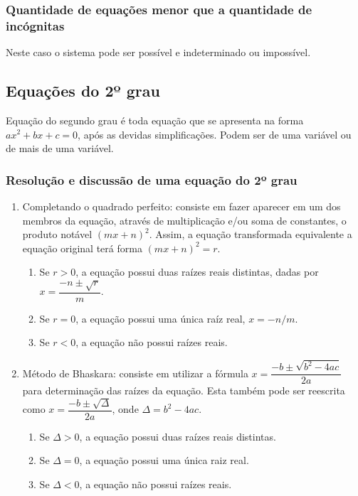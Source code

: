 \documentclass{article}
\begin{document}
\subsubsection{Quantidade de equações menor que a quantidade de incógnitas}
Neste caso o sistema pode ser possível e indeterminado ou impossível.


\subsection{Equações do 2º grau}
Equação do segundo grau é toda equação que se apresenta na forma $ax^2+bx+c=0$, após as devidas simplificações. Podem ser de uma variável ou de mais de uma variável.

\subsubsection{Resolução e discussão de uma equação do 2º grau}
\begin{enumerate}
    \item Completando o quadrado perfeito: consiste em fazer aparecer em um dos membros da equação, através de multiplicação e/ou soma de constantes, o produto notável $(mx+n)^2$. Assim, a equação transformada equivalente a equação original terá forma $(mx+n)^2=r$. 
        \begin{enumerate}[\quad i)]
            \item Se $r>0$, a equação possui duas raízes reais distintas, dadas por $x=\dfrac{-n\pm\sqrt{r}}{m}$.
            \item Se $r=0$, a equação possui uma única raíz real, $x=-n/m$.
            \item Se $r<0$, a equação não possui raízes reais.
        \end{enumerate}
    \item Método de Bhaskara: consiste em utilizar a fórmula $x=\dfrac{-b\pm\sqrt{b^2-4ac}}{2a}$ para determinação das raízes da equação. Esta também pode ser reescrita como $x=\dfrac{-b\pm\sqrt{\Delta}}{2a}$, onde $\Delta=b^2-4ac$.
        \begin{enumerate}[\quad i)]
            \item Se $\Delta>0$, a equação possui duas raízes reais distintas.
            \item Se $\Delta=0$, a equação possui uma única raiz real.
            \item Se $\Delta<0$, a equação não possui raízes reais.
        \end{enumerate}
\end{enumerate}
\end{document}
